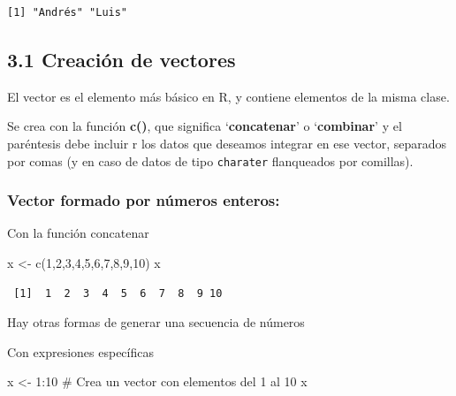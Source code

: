 \documentclass[
  letterpaper,
  DIV=11,
  numbers=noendperiod]{scrreprt}
\newenvironment{Shaded}{\begin{snugshade}}{\end{snugshade}}
\newcommand{\CommentTok}[1]{\textcolor[rgb]{0.37,0.37,0.37}{#1}}
\newcommand{\DecValTok}[1]{\textcolor[rgb]{0.68,0.00,0.00}{#1}}
\newcommand{\FunctionTok}[1]{\textcolor[rgb]{0.28,0.35,0.67}{#1}}
\newcommand{\NormalTok}[1]{\textcolor[rgb]{0.00,0.23,0.31}{#1}}
\newcommand{\OtherTok}[1]{\textcolor[rgb]{0.00,0.23,0.31}{#1}}
\newcommand{\SpecialCharTok}[1]{\textcolor[rgb]{0.37,0.37,0.37}{#1}}
\begin{document}
\begin{verbatim}
[1] "Andrés" "Luis"  
\end{verbatim}

\hypertarget{creaciuxf3n-de-vectores}{%
\subsection{3.1 Creación de vectores}\label{creaciuxf3n-de-vectores}}

El vector es el elemento más básico en R, y contiene elementos de la
misma clase.

Se crea con la función \textbf{c()}, que significa `\textbf{concatenar}'
o `\textbf{combinar}' y el paréntesis debe incluir r los datos que
deseamos integrar en ese vector, separados por comas (y en caso de datos
de tipo \texttt{charater} flanqueados por comillas).

\hypertarget{vector-formado-por-nuxfameros-enteros}{%
\subsubsection{Vector formado por números
enteros:}\label{vector-formado-por-nuxfameros-enteros}}

Con la función concatenar

\begin{Shaded}
\begin{Highlighting}[]
\NormalTok{x }\OtherTok{\textless{}{-}} \FunctionTok{c}\NormalTok{(}\DecValTok{1}\NormalTok{,}\DecValTok{2}\NormalTok{,}\DecValTok{3}\NormalTok{,}\DecValTok{4}\NormalTok{,}\DecValTok{5}\NormalTok{,}\DecValTok{6}\NormalTok{,}\DecValTok{7}\NormalTok{,}\DecValTok{8}\NormalTok{,}\DecValTok{9}\NormalTok{,}\DecValTok{10}\NormalTok{)}
\NormalTok{x}
\end{Highlighting}
\end{Shaded}

\begin{verbatim}
 [1]  1  2  3  4  5  6  7  8  9 10
\end{verbatim}

Hay otras formas de generar una secuencia de números

Con expresiones específicas

\begin{Shaded}
\begin{Highlighting}[]
\NormalTok{x }\OtherTok{\textless{}{-}} \DecValTok{1}\SpecialCharTok{:}\DecValTok{10}
\CommentTok{\# Crea un vector con elementos del 1 al 10}
\NormalTok{x}
\end{Highlighting}
\end{Shaded}
\end{document}

